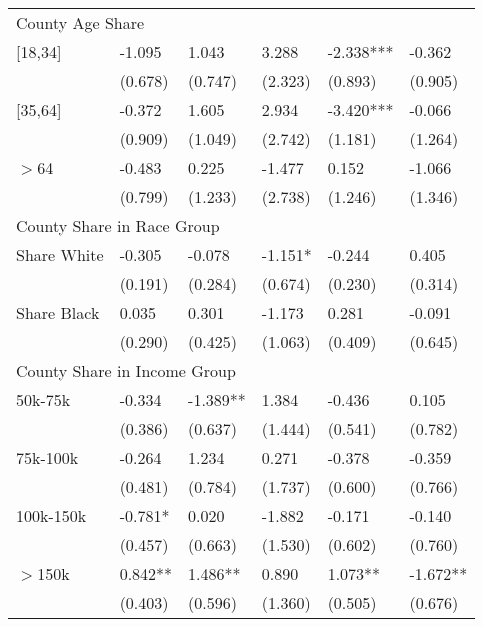 \documentclass[12pt]{article}
\begin{document}
{\begin{tabular}{llllll}
\multicolumn{6}{l}{County Age Share}\\											
\hspace{0.1in}[18,34]	&	-1.095	&	1.043	&	3.288	&	-2.338***	&	-0.362	\\
	&	(0.678)	&	(0.747)	&	(2.323)	&	(0.893)	&	(0.905)	\\
\hspace{0.1in}[35,64]	&	-0.372	&	1.605	&	2.934	&	-3.420***	&	-0.066	\\
	&	(0.909)	&	(1.049)	&	(2.742)	&	(1.181)	&	(1.264)	\\
\hspace{0.1in} $>$64	&	-0.483	&	0.225	&	-1.477	&	0.152	&	-1.066	\\
	&	(0.799)	&	(1.233)	&	(2.738)	&	(1.246)	&	(1.346)	\\
\hline											
\multicolumn{6}{l}{County Share in Race Group}\\											
\hspace{0.1in} Share White	&	-0.305	&	-0.078	&	-1.151*	&	-0.244	&	0.405	\\
	&	(0.191)	&	(0.284)	&	(0.674)	&	(0.230)	&	(0.314)	\\
\hspace{0.1in} Share Black	&	0.035	&	0.301	&	-1.173	&	0.281	&	-0.091	\\
	&	(0.290) &	(0.425)	&	(1.063)	&	(0.409)	&	(0.645)	\\
\hline											
\multicolumn{6}{l}{County Share in Income Group}\\											
\hspace{0.1in} 50k-75k	&	-0.334	&	-1.389**	&	1.384	&	-0.436	&	0.105	\\
	&	(0.386)	&	(0.637)	&	(1.444)	&	(0.541)	&	(0.782)	\\
\hspace{0.1in} 75k-100k	&	-0.264	&	1.234	&	0.271	&	-0.378	&	-0.359	\\
	&	(0.481)	&	(0.784)	&	(1.737)	&	(0.600)	&	(0.766)	\\
\hspace{0.1in} 100k-150k	&	-0.781*	&	0.020	&	-1.882	&	-0.171	&	-0.140	\\
	&	(0.457)	&	(0.663)	&	(1.530)	&	(0.602)	&	(0.760)	\\
\hspace{0.1in}$>$150k	&	0.842**	&	1.486**	&	0.890	&	1.073**	&	-1.672**	\\
	&	(0.403)	&	(0.596)	&	(1.360)	&	(0.505)	&	(0.676)	\\
\hline
\end{tabular}
}
\end{document}

